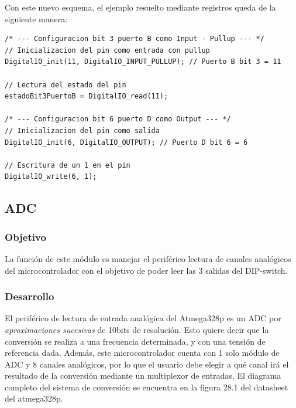 Con este nuevo esquema, el ejemplo resuelto mediante registros queda de la siguiente manera:
\begin{lstlisting}[style=CStyle]
/* --- Configuracion bit 3 puerto B como Input - Pullup --- */
// Inicializacion del pin como entrada con pullup
DigitalIO_init(11, DigitalIO_INPUT_PULLUP); // Puerto B bit 3 = 11

// Lectura del estado del pin
estadoBit3PuertoB = DigitalIO_read(11);

/* --- Configuracion bit 6 puerto D como Output --- */
// Inicializacion del pin como salida
DigitalIO_init(6, DigitalIO_OUTPUT); // Puerto D bit 6 = 6

// Escritura de un 1 en el pin
DigitalIO_write(6, 1);

\end{lstlisting}


\subsection{ADC}
\subsubsection{Objetivo}
La función de este módulo es manejar el periférico lectura de canales analógicos del microcontrolador con el objetivo de poder leer las 3 salidas del DIP-switch.

\subsubsection{Desarrollo}
El periférico de lectura de entrada analógica del Atmega328p es un ADC por \textit{aproximaciones sucesivas} de 10bits de resolución. Esto quiere decir que la conversión se realiza a una frecuencia determinada, y con una tensión de referencia dada. Además, este microcontrolador cuenta con 1 solo módulo de ADC y 8 canales analógicos, por lo que el usuario debe elegir a qué canal irá el resultado de la conversión mediante un multiplexor de entradas. El diagrama completo del sistema de conversión se encuentra en la figura 28.1 del datasheet del atmega328p.

